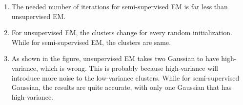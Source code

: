 \begin{answer}
    \begin{enumerate}
\item The needed number of iterations for semi-supervised EM is far less than unsupervised EM.
\item For unsupervised EM, the clusters change for every random initialization. While for semi-supervised EM, the clusters are same.
\item As shown in the figure, unsupervised EM takes two Gaussian to have high-variance, which is wrong. This is probably because high-variance will introduce more noise to the low-variance clusters. While for semi-supervised Gaussian, the results are quite accurate, with only one Gaussian that has high-variance.
    \end{enumerate}
 \end{answer}
